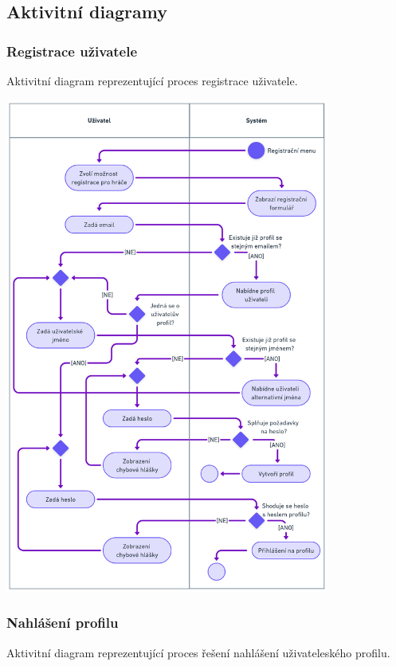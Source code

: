 \documentclass[czech,12pt,a4paper,titlepage]{article}
\begin{document}
\clearpage

\subsection{Aktivitní diagramy}
\subsubsection{Registrace uživatele}

Aktivitní diagram reprezentující proces registrace uživatele.

\bigskip
\bigskip
\bigskip
\bigskip
\bigskip
\bigskip


\includegraphics[width=0.8\textwidth, center]{Activity_diagram_1.png}

\clearpage

\subsubsection{Nahlášení profilu}

Aktivitní diagram reprezentující proces řešení nahlášení uživateleského profilu.
\end{document}
